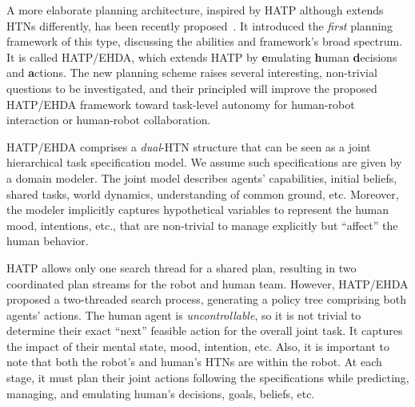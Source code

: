 \documentclass[letterpaper]{article} %
\newcommand{\note}[2][]{\added[#1,comment={#2}]{}}
\begin{document}
A more elaborate planning architecture, inspired by HATP although extends HTNs differently, has been recently proposed~\cite{BuisanA21,buisan:hal-03684211}.
It introduced the \textit{first} planning framework of this type, discussing the abilities and framework's broad spectrum.
It is called HATP/EHDA, which extends HATP by \textbf{e}mulating \textbf{h}uman \textbf{d}ecisions and \textbf{a}ctions. 
The new planning scheme raises several interesting, non-trivial questions to be investigated, and their principled will improve the proposed HATP/EHDA framework toward task-level autonomy for human-robot interaction or human-robot collaboration.

HATP/EHDA comprises a \textit{dual}-HTN structure that can be seen as a joint hierarchical task specification model. 
We assume such specifications are given by a domain modeler. The joint model describes agents' capabilities, initial beliefs, shared tasks, world dynamics, understanding of common ground, etc. Moreover, the modeler implicitly captures hypothetical variables to represent the human mood, intentions, etc., that are non-trivial to manage explicitly but ``affect'' the human behavior. 

HATP allows only one search thread for a shared plan, resulting in two coordinated plan streams for the robot and human team. 
However, HATP/EHDA proposed a two-threaded search process, generating a policy tree comprising both agents' actions. 
The human agent is \textit{uncontrollable}, so it is not trivial to determine their exact ``next'' feasible action for the overall joint task. It captures the impact of their mental state, mood, intention, etc.  
Also, it is important to note that both the robot's and human's HTNs are within the robot. At each stage, it must plan their joint actions following the specifications while predicting, managing, and emulating human's decisions, goals, beliefs, etc.
\end{document}
